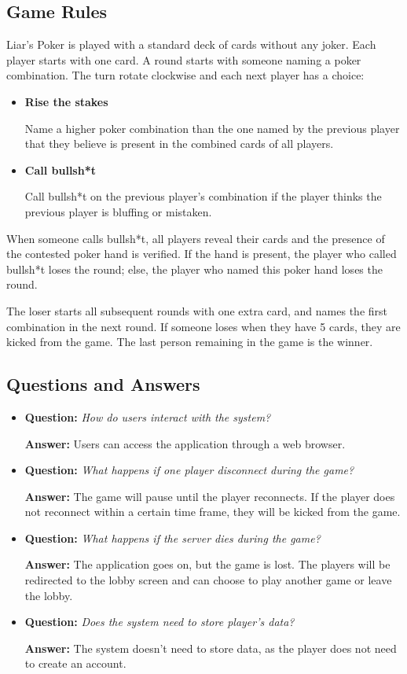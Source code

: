 \documentclass{scrartcl}
\begin{document}
\subsection{Game Rules}\label{game-rules}
Liar's Poker is played with a standard deck of cards without any joker. Each player starts with one
card. A round starts with someone naming a poker combination. The turn rotate clockwise and each
next player has a choice:
\begin{itemize}
      \item \textbf{Rise the stakes}\par
            Name a higher poker combination than the one named by the previous player that
            they believe is present in the combined cards of all players.
      \item \textbf{Call bullsh*t} \par
            Call bullsh*t on the previous player's combination if the player thinks the previous
            player is bluffing or mistaken.
\end{itemize}
When someone calls bullsh*t, all players reveal their cards and the presence of the contested poker
hand is verified. If the hand is present, the player who called bullsh*t loses the round; else, the
player who named this poker hand loses the round.

The loser starts all subsequent rounds with one extra card, and names the first combination in the
next round. If someone loses when they have 5 cards, they are kicked from the game.
The last person remaining in the game is the winner.

\subsection{Questions and Answers}\label{questions-and-answers}
\begin{itemize}
      \item \textbf{Question:} \emph{How do users interact with the system?}\par
            \textbf{Answer:} Users can access the application through a web browser.
      \item \textbf{Question:} \emph{What happens if one player disconnect during the game?}\par
            \textbf{Answer:} The game will pause until the player reconnects. If the player does not
            reconnect within a certain time frame, they will be kicked from the game.
      \item \textbf{Question:} \emph{What happens if the server dies during the game?}\par
            \textbf{Answer:} The application goes on, but the game is lost. The players will be
            redirected to the lobby screen and can choose to play another game or leave the lobby.
      \item \textbf{Question:} \emph{Does the system need to store player's data?}\par
            \textbf{Answer:} The system doesn't need to store data, as the player does not need to
            create an account.
\end{itemize}
\end{document}
